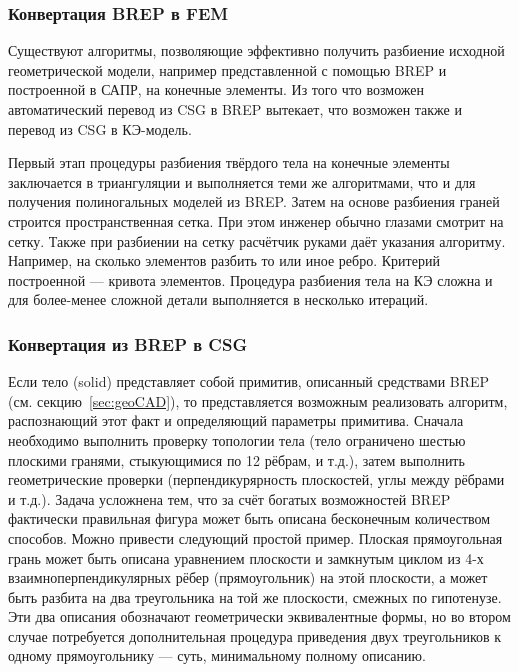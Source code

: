 \subsubsection{Конвертация BREP в FEM}\label{sec:secBREPtoFEM}

Существуют алгоритмы, позволяющие эффективно получить разбиение исходной геометрической модели, например представленной с помощью BREP и построенной в САПР, на конечные элементы. Из того что возможен автоматический перевод из CSG в BREP вытекает, что возможен также и перевод из CSG в КЭ-модель.

Первый этап процедуры разбиения твёрдого тела на конечные элементы заключается в триангуляции и выполняется теми же алгоритмами, что и для получения полиногальных моделей из BREP. Затем на основе разбиения граней строится пространственная сетка.
При этом инженер обычно глазами смотрит на сетку. Также при разбиении на сетку расчётчик руками даёт указания алгоритму. Например, на сколько элементов разбить то или иное ребро. Критерий построенной --- кривота элементов. Процедура разбиения тела на КЭ сложна и для более-менее сложной детали выполняется в несколько итераций. 

\subsubsection{Конвертация из BREP в CSG}\label{sec:secBREPtoCSG}

Если тело (solid) представляет собой примитив, описанный средствами BREP (см. секцию~\ref{sec:geoCAD}), то представляется возможным реализовать алгоритм, распознающий этот факт и определяющий параметры примитива. Сначала необходимо выполнить проверку топологии тела (тело ограничено шестью плоскими гранями, стыкующимися по 12 рёбрам, и т.д.), затем выполнить геометрические проверки (перпендикурярность плоскостей, углы между рёбрами и т.д.). Задача усложнена тем, что за счёт богатых возможностей BREP фактически правильная фигура может быть описана бесконечным количеством способов. Можно привести следующий простой пример. Плоская прямоугольная грань может быть описана уравнением плоскости и замкнутым циклом из 4-х взаимноперпендикулярных рёбер (прямоугольник) на этой плоскости, а может быть разбита на два треугольника на той же плоскости, смежных по гипотенузе. Эти два описания обозначают геометрически эквивалентные формы, но во втором случае потребуется дополнительная процедура приведения двух треугольников к одному прямоугольнику --- суть, минимальному полному описанию.

